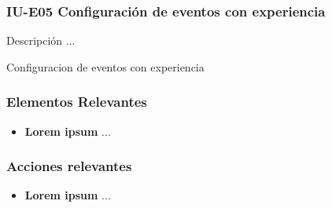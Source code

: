 
\subsubsection{IU-E05 Configuración de eventos con experiencia}

 Descripción ...

        {Configuracion de eventos con experiencia}

\subsubsection{Elementos Relevantes}

    \begin{itemize}
    \item {\bf Lorem ipsum}
        ...
    \end{itemize}

\subsubsection{Acciones relevantes}

    \begin{itemize}
    \item {\bf Lorem ipsum}
        ...
    \end{itemize}

\clearpage

